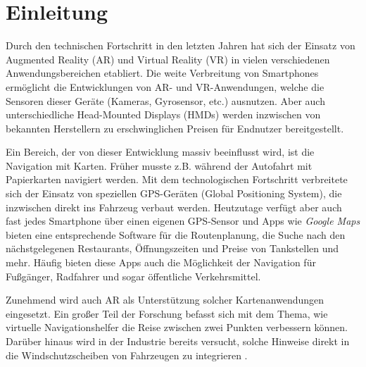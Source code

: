 \chapter{Einleitung}
\label{chap:einleitung}
Durch den technischen Fortschritt in den letzten Jahren hat sich der Einsatz von Augmented Reality (AR) und Virtual Reality (VR) in vielen verschiedenen Anwendungsbereichen etabliert.
Die weite Verbreitung von Smartphones ermöglicht die Entwicklungen von AR- und VR-Anwendungen, welche die Sensoren dieser Geräte (Kameras, Gyrosensor, etc.) ausnutzen.
Aber auch unterschiedliche Head-Mounted Displays (HMDs) werden inzwischen von bekannten Herstellern zu erschwinglichen Preisen für Endnutzer bereitgestellt.

Ein Bereich, der von dieser Entwicklung massiv beeinflusst wird, ist die Navigation mit Karten.
Früher musste z.B. während der Autofahrt mit Papierkarten navigiert werden.
Mit dem technologischen Fortschritt verbreitete sich der Einsatz von speziellen GPS-Geräten (Global Positioning System), die inzwischen direkt ins Fahrzeug verbaut werden.
Heutzutage verfügt aber auch fast jedes Smartphone über einen eigenen GPS-Sensor und Apps wie \emph{Google Maps} \parencite{GoogleLLC2018} bieten eine entsprechende Software für die Routenplanung, die Suche nach den nächstgelegenen Restaurants, Öffnungszeiten und Preise von Tankstellen und mehr.  
Häufig bieten diese Apps auch die Möglichkeit der Navigation für Fußgänger, Radfahrer und sogar öffentliche Verkehrsmittel.

Zunehmend wird auch AR als Unterstützung solcher Kartenanwendungen eingesetzt.
Ein großer Teil der Forschung befasst sich mit dem Thema, wie virtuelle Navigationshelfer die Reise zwischen zwei Punkten verbessern können.
Darüber hinaus wird in der Industrie bereits versucht, solche Hinweise direkt in die Windschutzscheiben von Fahrzeugen zu integrieren \parencites{Cunningham2017}{Sygic2018}.

